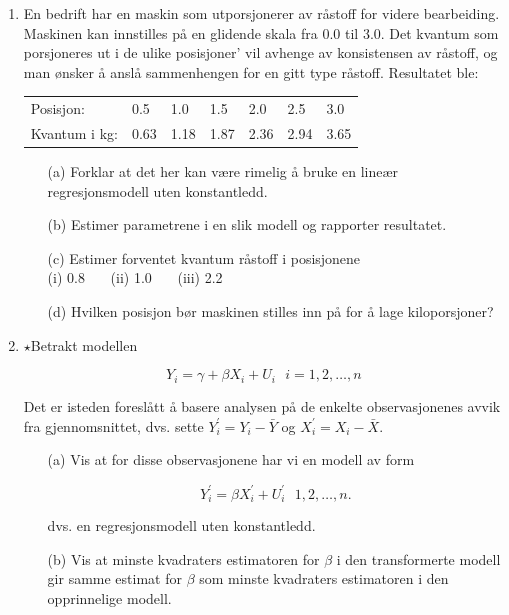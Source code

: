 \begin{enumerate}
\item
En bedrift har en maskin som utporsjonerer av råstoff for videre 
bearbeiding. Maskinen kan innstilles på en glidende skala fra 0.0 til
3.0.  Det kvantum som porsjoneres ut i de ulike posisjoner' vil avhenge av
konsistensen av råstoff, og man ønsker å anslå
sammenhengen for en gitt type råstoff.  Resultatet ble:
\begin{center}
\begin{tabular}{lllllll}
Posisjon:      &    0.5   &   1.0   &   1.5   &   2.0   &   2.5   &   3.0 \\
Kvantum i kg:  &    0.63  &   1.18  &   1.87  &   2.36  &   2.94  &   3.65
\end{tabular}
\end{center}
\begin{itemize}
\item[(a)] Forklar at det her kan være rimelig å bruke en lineær
   regresjonsmodell uten konstantledd.
\item[(b)] Estimer parametrene i en slik modell og rapporter resultatet.
\item[(c)] Estimer forventet kvantum råstoff i posisjonene \\
 (i) 0.8 \ \ \ (ii) 1.0 \ \ \ (iii) 2.2
\item[(d)] Hvilken posisjon bør maskinen stilles inn på for å
lage kiloporsjoner?
\end{itemize}

\item
 $\star$Betrakt modellen

\[  Y_i = \gamma +{\beta}X_i+U_i \mbox{\ \ \ } i = 1, 2, \ldots , n  \]

\noindent Det er isteden foreslått å basere analysen på de enkelte
observasjonenes avvik fra gjennomsnittet, dvs. sette
 $Y_i^{'} = Y_i - \bar{Y}$ og $X_i^{'} = X_i - \bar{X}$.

\begin{itemize}
\item[(a)] Vis at for disse observasjonene har vi en modell av form

\[ Y_i^{'} = {\beta}X_i^{'} + U_i^{'} \mbox{\ \ \ } 1, 2, \ldots, n. \]

\noindent dvs. en regresjonsmodell uten konstantledd.

\item[(b)] Vis at minste kvadraters estimatoren for $\beta$ i den 
transformerte modell gir samme estimat for $\beta$ som minste kvadraters
estimatoren i den opprinnelige modell.


\end{itemize}
\end{enumerate}

